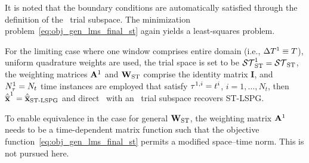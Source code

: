 It is noted that the boundary conditions are automatically satisfied through the definition of the \spaceTimeAcronym\ trial subspace. The minimization problem~\eqref{eq:obj_gen_lms_final_st} again yields a least-squares problem.
\begin{remark}
For the limiting case where one window comprises entire domain (i.e., $\Delta T^{1}\equiv T$), uniform quadrature weights are used, the trial space is set to be $\mathcal{ ST }_{\text{ST}}^{1} = \mathcal{ ST }_{\text{ST}}$, the weighting matrices $\mathbf{A}^{1}$ and $\mathbf{W}_{\text{ST}}$ comprise the identity matrix $\mathbf{I}$, and $N_{\tau}^{1} = N_t$ time instances are employed that satisfy $\tau^{1,i} = t^i$, $i=1,\ldots,N_t$, then $\hat{\mathbf{\overline{x}}}^{1} =  \hat{\mathbf{\overline{x}}}_\text{ST-LSPG}$ and direct \methodAcronym\ with an \spaceTimeAcronym\ trial subspace recovers ST-LSPG. 
\end{remark}

\begin{remark}
To enable equivalence in the case for general $\mathbf{W}_{\text{ST}}$, the weighting matrix $\mathbf{A}^{1}$ needs to be a time-dependent matrix function such that the objective function~\eqref{eq:obj_gen_lms_final_st} permits a modified space--time norm. This is not pursued here.
\end{remark}
 
